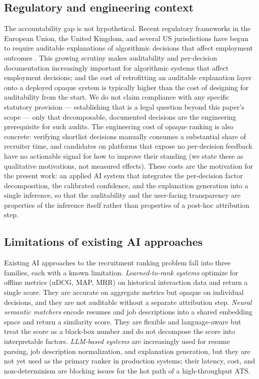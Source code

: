 \subsection{Regulatory and engineering context}\label{sec:1.2}
The accountability gap is not hypothetical.
Recent regulatory frameworks in the European Union, the United Kingdom, and several US jurisdictions have begun to require auditable explanations of algorithmic decisions that affect employment outcomes \citep{raub2018bots,ajunwa2021paradox}.
This growing scrutiny makes auditability and per-decision documentation increasingly important for algorithmic systems that affect employment decisions; and the cost of retrofitting an auditable explanation layer onto a deployed opaque system is typically higher than the cost of designing for auditability from the start. We do not claim compliance with any specific statutory provision --- establishing that is a legal question beyond this paper's scope --- only that decomposable, documented decisions are the engineering prerequisite for such audits.
The engineering cost of opaque ranking is also concrete: verifying shortlist decisions manually consumes a substantial share of recruiter time, and candidates on platforms that expose no per-decision feedback have no actionable signal for how to improve their standing (we state these as qualitative motivations, not measured effects).
These costs are the motivation for the present work: an applied AI system that integrates the per-decision factor decomposition, the calibrated confidence, and the explanation generation into a single inference, so that the auditability and the user-facing transparency are properties of the inference itself rather than properties of a post-hoc attribution step.

\subsection{Limitations of existing AI approaches}\label{sec:1.3}
Existing AI approaches to the recruitment ranking problem fall into three families, each with a known limitation.
\emph{Learned-to-rank systems} \citep{he2017neural,covington2016deep,koren2009matrix} optimize for offline metrics (nDCG, MAP, MRR) on historical interaction data and return a single score.
They are accurate on aggregate metrics but opaque on individual decisions, and they are not auditable without a separate attribution step.
\emph{Neural semantic matchers} \citep{reimers2019sentence} encode resumes and job descriptions into a shared embedding space and return a similarity score.
They are flexible and language-aware but treat the score as a black-box number and do not decompose the score into interpretable factors.
\emph{LLM-based systems} \citep{wei2022chain,yao2023react,sumers2024cognitive} are increasingly used for resume parsing, job description normalization, and explanation generation, but they are not yet used as the primary ranker in production systems; their latency, cost, and non-determinism are blocking issues for the hot path of a high-throughput ATS.

